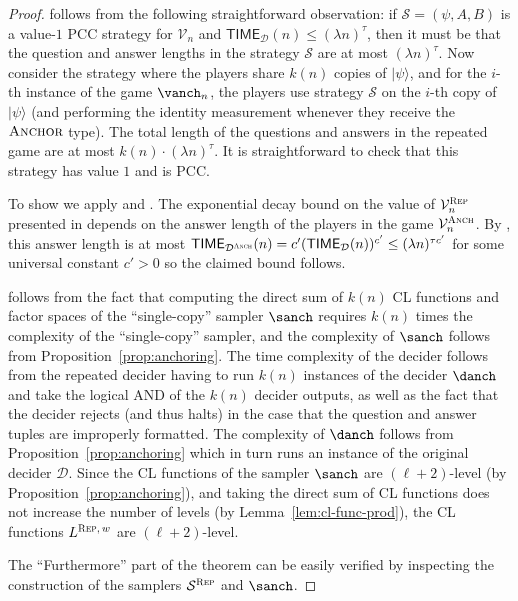 \documentclass[11pt]{article}
\theoremstyle{definition}
\newcommand{\ket}[1]{|#1\rangle}
\newcommand{\sampler}{\mathcal{S}}
\newcommand{\decider}{\mathcal{D}}
\newcommand{\verifier}{\mathcal{V}}
\newcommand{\strategy}{\mathscr{S}}
\newcommand{\gamestyle}[1]{\ensuremath{\textsc{#1}}\xspace}
\newcommand{\typestyle}[1]{\ensuremath{\textsc{#1}}\xspace}
\newcommand{\Anchor}{\typestyle{Anchor}}
\newcommand{\TIME}{\mathsf{TIME}}
\newcommand{\anch}{\gamestyle{Anch}}
\newcommand{\rep}{\gamestyle{Rep}}
\begin{document}
\begin{proof}
	 follows from the following straightforward
  observation: if $\strategy = (\psi,A,B)$ is a value-$1$ PCC strategy for
  $\verifier_n$ and $\TIME_\decider(n) \leq (\lambda n)^\tau$, then it must be
  that the question and answer lengths in the strategy $\strategy$ are at most $(\lambda n)^\tau$. Now
  consider the strategy where the players share $k(n)$ copies of
  $\ket{\psi}$, and for the $i$-th instance of the game $\vanch_n$, the
  players use strategy $\strategy$ on the $i$-th copy of $\ket{\psi}$ (and
  performing the identity measurement whenever they receive the $\Anchor$ type). 
  The total length of the questions and answers in the repeated game are at most $k(n) \cdot (\lambda n)^\tau$. 
  It is straightforward to check that this strategy has value $1$ and is PCC.

	To show  we apply  and . 
  The exponential decay bound on the value of $\verifier^\rep_n$ presented
  in  depends on the answer length of the players in
  the game $\verifier_n^\anch$.
  By , this answer length is at most
  $\TIME_{\decider^\anch}(n) = c' (\TIME_\decider(n))^{c'} \leq (\lambda n)^{\tau c'}$ for some universal constant $c' > 0$ so the claimed bound follows.
	
	 follows from the fact that computing the direct sum
  of $k(n)$ CL functions and factor spaces of the ``single-copy'' sampler
  $\sanch$ requires $k(n)$ times the complexity of the ``single-copy''
  sampler, and the complexity of $\sanch$ follows from
  Proposition~\ref{prop:anchoring}.
	The time complexity of the decider follows from the repeated decider having to
  run $k(n)$ instances of the decider $\danch$ and take the logical AND
  of the $k(n)$ decider outputs, as well as the fact that the decider rejects (and thus halts) in the case that the question and answer tuples are improperly formatted. 
  The complexity of $\danch$ follows from
  Proposition~\ref{prop:anchoring} which in turn runs an instance of the
  original decider $\decider$.
  Since the CL functions of the sampler $\sanch$ are $(\ell+2)$-level
  (by Proposition~\ref{prop:anchoring}), and taking the direct sum of CL
  functions does not increase the number of levels (by
  Lemma~\ref{lem:cl-func-prod}), the CL functions $L^{\rep,\, w}$ are
  $(\ell+2)$-level.
  
  The ``Furthermore'' part of the theorem can be easily verified by inspecting the construction of the samplers $\sampler^\rep$ and $\sanch$. 
\end{proof}
\end{document}
